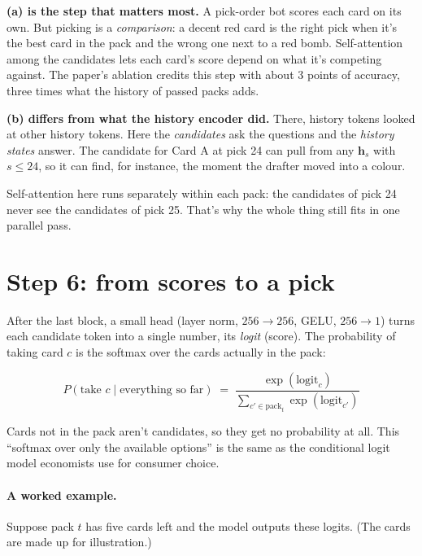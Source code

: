 \documentclass[11pt,letterpaper]{article}
\begin{document}
\textbf{(a) is the step that matters most.} A pick-order bot scores each card on its own. But picking is
a \emph{comparison}: a decent red card is the right pick when it's the best card in the pack and the wrong
one next to a red bomb. Self-attention among the candidates lets each card's score depend on what it's
competing against. The paper's ablation credits this step with about 3 points of accuracy, three times
what the history of passed packs adds.

\textbf{(b) differs from what the history encoder did.} There, history tokens looked at other history
tokens. Here the \emph{candidates} ask the questions and the \emph{history states} answer. The candidate
for Card A at pick 24 can pull from any $\mathbf{h}_{s}$ with $s\le24$, so it can find, for instance, the
moment the drafter moved into a colour.

Self-attention here runs separately within each pack: the candidates of pick 24 never see the candidates
of pick 25. That's why the whole thing still fits in one parallel pass.

\section{Step 6: from scores to a pick}\label{sec:softmax}

After the last block, a small head (layer norm, $256\to256$, GELU, $256\to1$) turns each candidate token
into a single number, its \emph{logit} (score). The probability of taking card $c$ is the softmax over the
cards actually in the pack:

\[
P(\text{take } c \mid \text{everything so far}) \;=\;
\frac{\exp(\text{logit}_c)}{\sum_{c' \in \text{pack}_t} \exp(\text{logit}_{c'})}
\]

Cards not in the pack aren't candidates, so they get no probability at all. This ``softmax over only the
available options'' is the same as the conditional logit model economists use for consumer choice.

\paragraph{A worked example.} Suppose pack $t$ has five cards left and the model outputs these logits.
(The cards are made up for illustration.)
\end{document}
